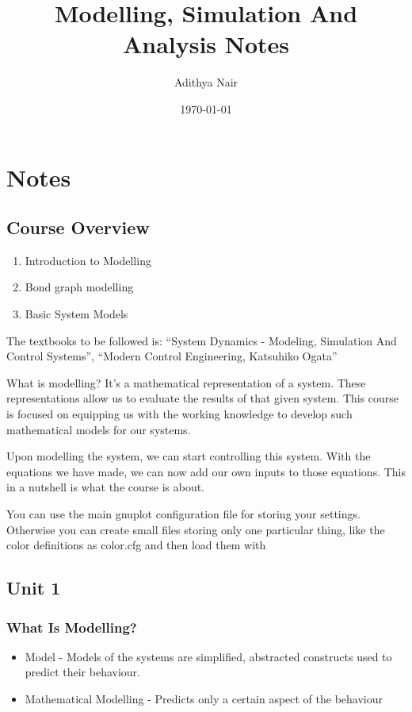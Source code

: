 \documentclass[11pt]{report}
\author{Adithya Nair}
\date{\today}
\title{Modelling, Simulation And Analysis Notes}
\begin{document}
\maketitle
\tableofcontents

\part{Notes}
\label{sec:org8932c8b}
\chapter{Course Overview}
\label{sec:org87ebba8}
\begin{enumerate}
\item Introduction to Modelling
\item Bond graph modelling
\item Basic System Models
\end{enumerate}

The textbooks to be followed is: ``System Dynamics - Modeling, Simulation And Control Systems'', ``Modern Control Engineering, Katsuhiko Ogata''

What is modelling? It's a mathematical representation of a system. These representations allow us to evaluate the results of that given system. This course is focused on equipping us with the working knowledge to develop such mathematical models for our systems.

Upon modelling the system, we can start controlling this system. With the equations we have made, we can now add our own inputs to those equations. This in a nutshell is what the course is about.

You can use the main gnuplot configuration file for storing your settings. Otherwise you can create small files storing only one particular thing, like the color definitions as color.cfg and then load them with
\chapter{Unit 1}
\label{sec:orge1d4b01}
\section{What Is Modelling?}
\label{sec:orgc1d3397}
\begin{itemize}
\item Model - Models of the systems are simplified, abstracted constructs used to predict their behaviour.
\item Mathematical Modelling - Predicts only a certain aspect of the behaviour
\end{itemize}
\end{document}
